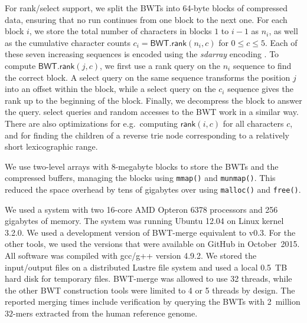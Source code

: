\documentclass[smallabstract,smallcaptions]{dccpaper}
\newcommand{\BWT}{\textsf{BWT}}
\newcommand{\mBWT}{\ensuremath{\mathsf{BWT}}}
\newcommand{\rank}{\textsf{rank}}
\newcommand{\select}{\textsf{select}}
\newcommand{\mrank}{\ensuremath{\mathsf{rank}}}
\newcommand{\BWTmerge}{\textsf{BWT\nobreakdash-merge}}
\begin{document}
For \rank/\select{} support, we split the \BWT{}s into 64\nobreakdash-byte blocks of compressed data, ensuring that no run continues from one block to the next one. For each block $i$, we store the total number of characters in blocks $1$ to $i-1$ as $n_{i}$, as well as the cumulative character counts $c_{i} = \mBWT.\mrank(n_{i},c)$ for $0 \le c \le 5$. Each of these seven increasing sequences is encoded using the \emph{sdarray} encoding \cite{Okanohara2007}. To compute $\mBWT.\mrank(j,c)$, we first use a \rank{} query on the $n_{i}$ sequence to find the correct block. A \select{} query on the same sequence transforms the position $j$ into an offset within the block, while a \select{} query on the $c_{i}$ sequence gives the rank up to the beginning of the block. Finally, we decompress the block to answer the query. \select{} queries and random accesses to the \BWT{} work in a similar way. There are also optimizations for e.g.~computing $\mrank(i,c)$ for all characters $c$, and for finding the children of a reverse trie node corresponding to a relatively short lexicographic range.

We use two-level arrays with 8\nobreakdash-megabyte blocks to store the \BWT{}s and the compressed buffers, managing the blocks using \texttt{mmap()} and \texttt{munmap()}. This reduced the space overhead by tens of gigabytes over using \texttt{malloc()} and \texttt{free()}.



We used a system with two 16\nobreakdash-core AMD Opteron 6378 processors and 256 gigabytes of memory. The system was running Ubuntu 12.04 on Linux kernel 3.2.0. We used a development version of \BWTmerge{}  equivalent to v0.3. For the other tools, we used the versions that were available on GitHub in October~2015. All software was compiled with gcc/g++ version 4.9.2. We stored the input/output files on a distributed Lustre file system and used a local 0.5~TB hard disk for temporary files. \BWTmerge{} was allowed to use 32 threads, while the other \BWT{} construction tools were limited to 4 or 5 threads by design. The reported merging times include verification by querying the \BWT{}s with 2~million $32$\nobreakdash-mers extracted from the human reference genome.
\end{document}

